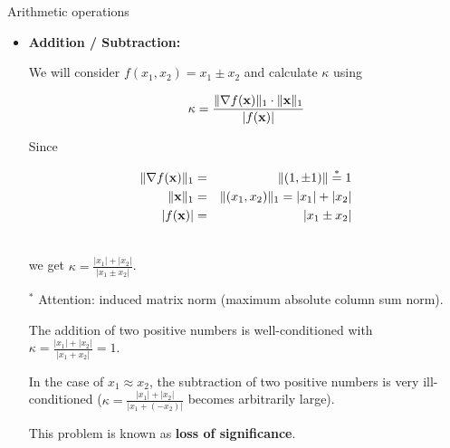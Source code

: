 \documentclass[11pt,compress,t,notes=noshow, xcolor=table]{beamer}
\begin{document}
\begin{vbframe}{Arithmetic operations}
\begin{itemize}
\item \textbf{Addition / Subtraction: }

We will consider $f(x_1, x_2) = x_1 \pm x_2$ and calculate $\kappa$ using

$$
\kappa = \frac{\|\nabla f(\mathbf{x})\|_1 \cdot \|\mathbf{x}\|_1}{|f(\mathbf{x})|}
$$

Since

\vspace*{-.5cm}

\begin{eqnarray*}
\|\nabla f(\mathbf{x})\|_1 &=& \|(1, \pm 1) \|\overset{*}{=} 1 \\\
\|\mathbf{x}\|_1 &=& \|(x_1, x_2)\|_1 = |x_1| + |x_2| \\\
|f(\mathbf{x})| &=& |x_1 \pm x_2|\\\
\end{eqnarray*}

\vspace*{-.5cm}

we get $\kappa = \frac{|x_1| + |x_2|}{|x_1 \pm x_2|}$.

\lz

\begin{footnotesize}
$^*$ Attention: induced matrix norm (maximum absolute column sum norm).
\end{footnotesize}

\framebreak

The addition of two positive numbers is well-conditioned with $\kappa = \frac{|x_1| + |x_2|}{|x_1 + x_2|} = 1$.

\lz

In the case of $x_1 \approx x_2$, the subtraction of two positive numbers is very ill-conditioned  ($\kappa = \frac{|x_1| + |x_2|}{|x_1 + (- x_2)|}$ becomes arbitrarily large).
\lz

This problem is known as \textbf{loss of significance}.

\end{itemize}

\end{vbframe}
\end{document}
